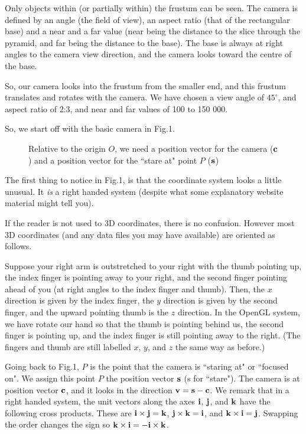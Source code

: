 \documentclass[12pt]{article}
\begin{document}
Only objects within
(or partially within) the frustum can be seen. The camera is defined
by an angle (the field of view), an aspect ratio (that of the rectangular base)
 and a near and a far value (near being the distance to the slice through
the pyramid, and far being the distance to the base). The base is always
at right angles to the camera view direction, and the camera looks toward the centre
of the base.

So, our camera looks into the  frustum from 
the smaller end, and this
frustum translates and rotates with the camera. 
We have chosen a view angle of $45^\circ$, and aspect ratio of 2:3,
and near and far values of 100 to 150 000.

So, we start off with the basic
camera in Fig.1.
\begin{figure}[htb]
\vspace*{10cm}
\caption{ 
Relative to the origin $O$, we need a position vector 
for the camera (${\bf c}$) and
a position vector for the ``stare at" point $P$ (${\bf s}$)
}
\end{figure}

The first thing to notice in Fig.1,  is that the coordinate system
looks a little unusual. It {\it is} a right handed system
(despite what some explanatory website material might tell you).

If the reader is not used to 3D coordinates, there is no confusion. However
most 3D coordinates (and any  data files you may have available) are oriented
 as follows.

 Suppose your right arm is outstretched to your right with 
the thumb pointing up, the index finger is  pointing away to your right, and
 the second finger
pointing  ahead of you (at right angles to the index finger and thumb). Then,
the $x$ direction is given by the index finger, the $y$ direction is
given by the second finger, and the upward pointing thumb is the $z$ direction.
In the OpenGL system, we have rotate our hand so that the thumb is pointing
behind us, the second finger is pointing  up, and the index finger is still pointing away 
to the right. (The fingers and thumb are still labelled $x$, $y$, and $z$ the
same way as before.)


Going back to Fig.1,  $P$ is the point that the camera is ``staring at"
or ``focused on". 
We assign this point $P$ the position vector $\bf s$
 (s for ``stare").
The camera is at position vector $\bf c$, and it looks
in the direction $\bf v= s-c$. We remark that in a right handed
system, the unit vectors along the axes $\bf i$, $\bf j$, and $\bf k$
have the following cross products. These are $ {\bf i} \times {\bf j}={\bf k}$,
$ {\bf j} \times {\bf k}={\bf i}$, and $ {\bf k} \times {\bf i}={\bf j}$.
Swapping the order changes the sign so 
$ {\bf k} \times {\bf i}= -{\bf i} \times {\bf k}$. 
\end{document}
